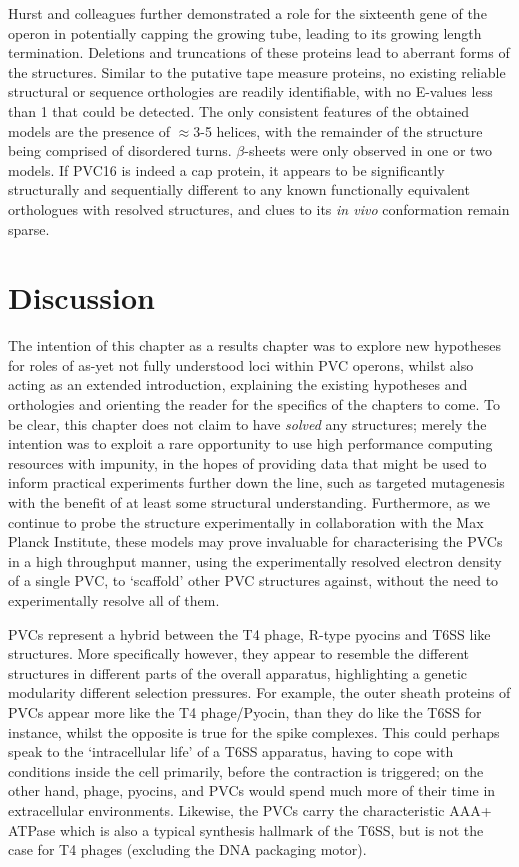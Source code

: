 Hurst and colleagues further demonstrated a role for the sixteenth gene of the operon in potentially capping the growing tube, leading to its growing length termination. Deletions and truncations of these proteins lead to aberrant forms of the structures. Similar to the putative tape measure proteins, no existing reliable structural or sequence orthologies are readily identifiable, with no E-values less than 1 that could be detected. The only consistent features of the obtained models are the presence of $\approx$3-5 helices, with the remainder of the structure being comprised of disordered turns. $\beta$-sheets were only observed in one or two models. If PVC16 is indeed a cap protein, it appears to be significantly structurally and sequentially different to any known functionally equivalent orthologues with resolved structures, and clues to its \emph{in vivo} conformation remain sparse.



\clearpage
\section{Discussion}
The intention of this chapter as a results chapter was to explore new hypotheses for roles of as-yet not fully understood loci within PVC operons, whilst also acting as an extended introduction, explaining the existing hypotheses and orthologies and orienting the reader for the specifics of the chapters to come. To be clear, this chapter does not claim to have \emph{solved} any structures; merely the intention was to exploit a rare opportunity to use high performance computing resources with impunity, in the hopes of providing data that might be used to inform practical experiments further down the line, such as targeted mutagenesis with the benefit of at least some structural understanding. Furthermore, as we continue to probe the structure experimentally in collaboration with the Max Planck Institute, these models may prove invaluable for characterising the PVCs in a high throughput manner, using the experimentally resolved electron density of a single PVC, to `scaffold' other PVC structures against, without the need to experimentally resolve all of them.

PVCs represent a hybrid between the T4 phage, R-type pyocins and T6SS like structures. More specifically however, they appear to resemble the different structures in different parts of the overall apparatus, highlighting a genetic modularity different selection pressures. For example, the outer sheath proteins of PVCs appear more like the T4 phage/Pyocin, than they do like the T6SS for instance, whilst the opposite is true for the spike complexes. This could perhaps speak to the `intracellular life' of a T6SS apparatus, having to cope with conditions inside the cell primarily, before the contraction is triggered; on the other hand, phage, pyocins, and PVCs would spend much more of their time in extracellular environments. Likewise, the PVCs carry the characteristic AAA+ ATPase which is also a typical synthesis hallmark of the T6SS, but is not the case for T4 phages (excluding the DNA packaging motor).

